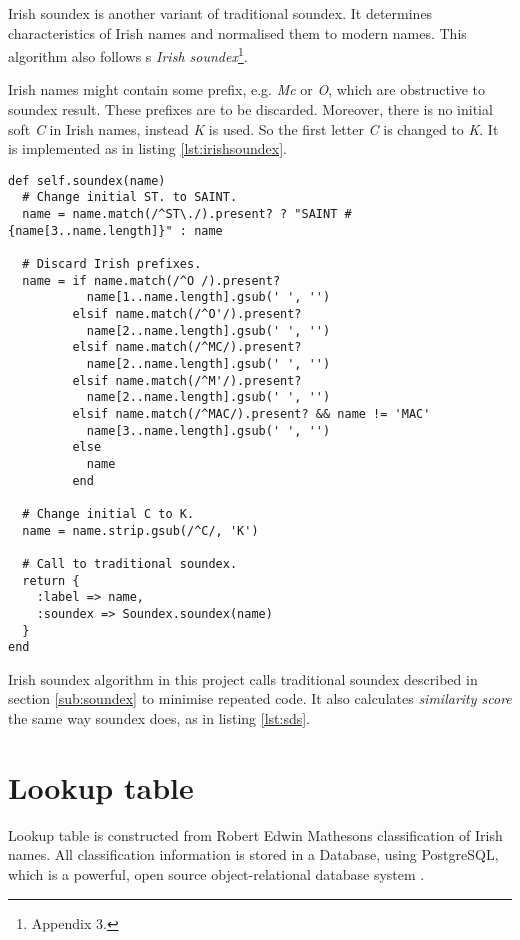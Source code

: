 Irish soundex is another variant of traditional soundex. It determines
characteristics of Irish names and normalised them to modern names.
This algorithm also follows \citeauthor{adamw}\textquotesingle s
\emph{Irish soundex}\footnote{\cite{adamw} Appendix 3.}.

Irish names might contain some prefix, e.g. \emph{Mc} or \emph{O},
which are obstructive to soundex result. These prefixes are to be
discarded. Moreover, there is no initial soft \emph{C} in Irish names,
instead \emph{K} is used. So the first letter \emph{C} is changed to \emph{K}.
It is implemented as in listing \ref{lst:irishsoundex}.

\begin{minipage}{\linewidth}
\begin{lstlisting}[label={lst:irishsoundex}, caption={Irish soundex implementation.}]
def self.soundex(name)
  # Change initial ST. to SAINT.
  name = name.match(/^ST\./).present? ? "SAINT #{name[3..name.length]}" : name

  # Discard Irish prefixes.
  name = if name.match(/^O /).present?
           name[1..name.length].gsub(' ', '')
         elsif name.match(/^O'/).present?
           name[2..name.length].gsub(' ', '')
         elsif name.match(/^MC/).present?
           name[2..name.length].gsub(' ', '')
         elsif name.match(/^M'/).present?
           name[2..name.length].gsub(' ', '')
         elsif name.match(/^MAC/).present? && name != 'MAC'
           name[3..name.length].gsub(' ', '')
         else
           name
         end

  # Change initial C to K.
  name = name.strip.gsub(/^C/, 'K')

  # Call to traditional soundex.
  return {
    :label => name,
    :soundex => Soundex.soundex(name)
  }
end
\end{lstlisting}
\end{minipage}

Irish soundex algorithm in this project calls traditional soundex
described in section \ref{sub:soundex} to minimise repeated code.
It also calculates \emph{similarity score} the same way
soundex does, as in listing \ref{lst:sds}.

\section{Lookup table}

Lookup table is constructed from Robert Edwin Matheson\textquotesingle s
classification of Irish names. All classification information
is stored in a Database, using PostgreSQL, which is a powerful,
open source object-relational database system \cite[]{postgresql}.

